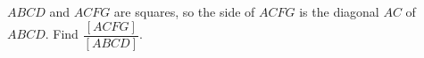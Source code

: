$ABCD$ and $ACFG$ are squares, so the side of $ACFG$ is the diagonal $AC$ of $ABCD$. Find $\dfrac{[ACFG]}{[ABCD]}$.
